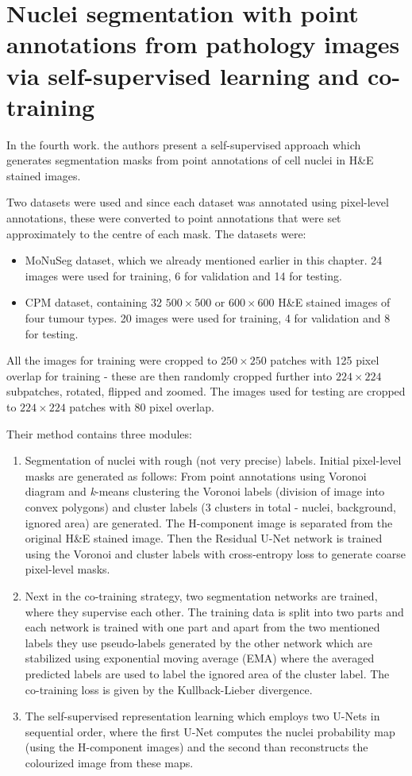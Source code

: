 \section{Nuclei segmentation with point annotations from pathology images via self-supervised learning and co-training \cite{Lin2023}}
In the fourth work. the authors present a self-supervised approach which generates segmentation masks from point annotations of cell nuclei in H\&E stained images.

Two datasets were used and since each dataset was annotated using pixel-level annotations, these were converted to point annotations that were set approximately to the centre of each mask. The datasets were:

\begin{itemize}
    \item MoNuSeg dataset, which we already mentioned earlier in this chapter. 24 images were used for training, 6 for validation and 14 for testing.
    \item CPM dataset, containing 32 $500\!\times\!500$ or $600\!\times\!600$ H\&E stained images of four tumour types. 20 images were used for training, 4 for validation and 8 for testing.
\end{itemize}

All the images for training were cropped to $250\!\times\!250$ patches with 125 pixel overlap for training - these are then randomly cropped further into $224\!\times\!224$ subpatches, rotated, flipped and zoomed. The images used for testing are cropped to $224\!\times\!224$ patches with 80 pixel overlap.

Their method contains three modules:

\begin{enumerate}
    \item Segmentation of nuclei with rough (not very precise) labels. Initial pixel-level masks are generated as follows: From point annotations using Voronoi diagram and \textit{k}-means clustering the Voronoi labels (division of image into convex polygons) and cluster labels (3 clusters in total - nuclei, background, ignored area) are generated. The H-component image is separated from the original H\&E stained image. Then the Residual U-Net network is trained using the Voronoi and cluster labels with cross-entropy loss to generate coarse pixel-level masks.
    \item Next in the co-training strategy, two segmentation networks are trained, where they supervise each other. The training data is split into two parts and each network is trained with one part and apart from the two mentioned labels they use pseudo-labels generated by the other network which are stabilized using exponential moving average (EMA) where the averaged predicted labels are used to label the ignored area of the cluster label. The co-training loss is given by the Kullback-Lieber divergence.
    \item The self-supervised representation learning which employs two U-Nets in sequential order, where the first U-Net computes the nuclei probability map (using the H-component images) and the second than reconstructs the colourized image from these maps.
\end{enumerate}

